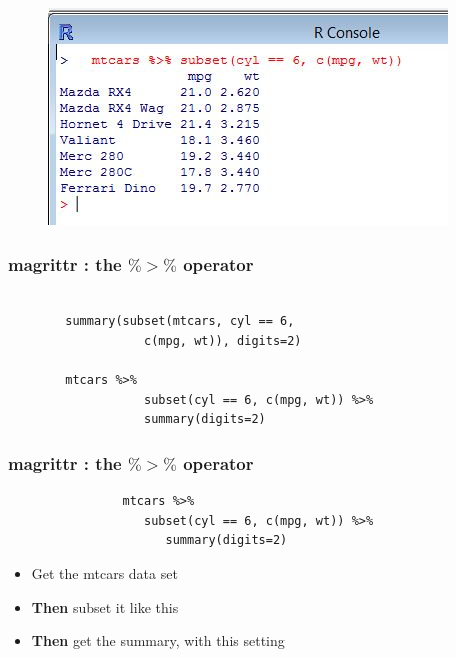 \documentclass{beamer}
\begin{document}
			\begin{frame}
				\begin{figure}
					\centering
					\includegraphics[width=0.99\linewidth]{images/magrittrcode01}
					
				\end{figure}
				
			\end{frame}
		\begin{frame}[fragile]
		\frametitle{magrittr :  the $\%>\%$ operator}
		\Large
		\begin{framed}
		\begin{verbatim}
			
		summary(subset(mtcars, cyl == 6, 
		           c(mpg, wt)), digits=2)
		  
		mtcars %>% 
				   subset(cyl == 6, c(mpg, wt)) %>% 
				   summary(digits=2)
		\end{verbatim}
		\end{framed}
	
	\end{frame}
		\begin{frame}[fragile]
			\frametitle{magrittr :  the $\%>\%$ operator}
			\Large
			\begin{framed}
				\begin{verbatim}	
				mtcars %>% 
				   subset(cyl == 6, c(mpg, wt)) %>% 
				      summary(digits=2)
				\end{verbatim}
			\end{framed}
			\begin{itemize}
				\item Get the mtcars data set
				\item \textbf{Then} subset it like this
				\item \textbf{Then} get the summary, with this setting
			\end{itemize}
			\end{frame}
\end{document}
